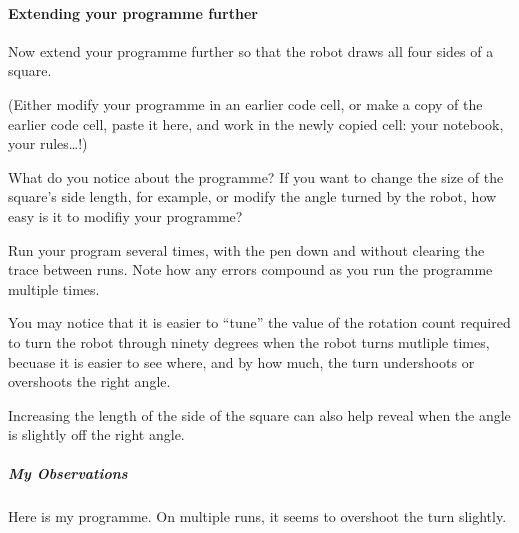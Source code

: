 \documentclass[letterpaper,10pt,english]{sphinxmanual}
\begin{document}
\paragraph{Extending your programme further}
\label{\detokenize{content/01_Robot_Lab/Section_00_01:Extending-your-programme-further}}
Now extend your programme further so that the robot draws all four sides of a square.

(Either modify your programme in an earlier code cell, or make a copy of the earlier code cell, paste it here, and work in the newly copied cell: your notebook, your rules…!)

What do you notice about the programme? If you want to change the size of the square’s side length, for example, or modify the angle turned by the robot, how easy is it to modifiy your programme?

Run your program several times, with the pen down and without clearing the trace between runs. Note how any errors compound as you run the programme multiple times.

You may notice that it is easier to “tune” the value of the rotation count required to turn the robot through ninety degrees when the robot turns mutliple times, becuase it is easier to see where, and by how much, the turn undershoots or overshoots the right angle.

Increasing the length of the side of the square can also help reveal when the angle is slightly off the right angle.


\subparagraph{My Observations}
\label{\detokenize{content/01_Robot_Lab/Section_00_01:My-Observations}}
Here is my programme. On multiple runs, it seems to overshoot the turn slightly.
\end{document}
